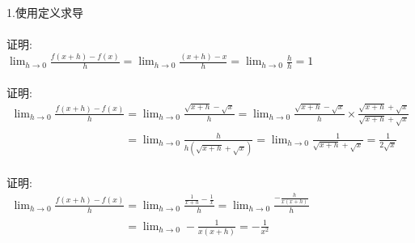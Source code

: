 \documentclass[UTF8, fontset=ubuntu]{ctexart}
\begin{document}
1.使用定义求导\\
\\
证明:\\
$\displaystyle\lim_{h\to 0}\frac{f(x+h)-f(x)}{h}=\lim_{h\to 0}\frac{(x+h)-x}{h}=\lim_{h\to 0}\frac{h}{h}=1$\\[4ex]

\\
证明:\\
\begin{math}
\begin{array}{l}
\displaystyle\lim_{h\to 0}\frac{f(x+h)-f(x)}{h}=\lim_{h\to 0}\frac{\sqrt{x+h}-\sqrt{x}}{h}=\lim_{h\to 0}\frac{\sqrt{x+h}-\sqrt{x}}{h}\times\frac{\sqrt{x+h}+\sqrt{x}}{\sqrt{x+h}+\sqrt{x}}\\
\displaystyle\phantom{\lim_{h\to 0}\frac{f(x+h)-f(x)}{h}}=\lim_{h\to 0}\frac{h}{h(\sqrt{x+h}+\sqrt{x})}=\lim_{h\to 0}\frac{1}{\sqrt{x+h}+\sqrt{x}}=\frac{1}{2\sqrt{x}}
\end{array}
\end{math}\\[4ex]

\\
证明:\\
\begin{math}
\begin{array}{l}
\displaystyle\lim_{h\to 0}\frac{f(x+h)-f(x)}{h}=\lim_{h\to 0}\frac{\frac{1}{x+h}-\frac{1}{x}}{h}=\lim_{h\to 0}\frac{-\frac{h}{x(x+h)}}{h}\\
\displaystyle\phantom{\lim_{h\to 0}\frac{f(x+h)-f(x)}{h}}=\lim_{h\to 0}-\frac{1}{x(x+h)}=-\frac{1}{x^2}
\end{array}
\end{math}\\[4ex]

\\[4ex]
\end{document}
